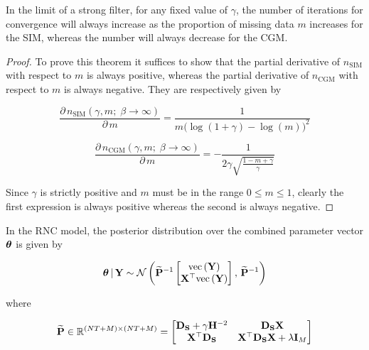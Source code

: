 \begin{theorem}
    \label{the:m_deriv}
    In the limit of a strong filter, for any fixed value of $\gamma$, the number of iterations for convergence will always increase as the proportion of missing data $m$ increases for the SIM, whereas the number will always decrease for the CGM.  
\end{theorem}

\begin{proof}
    To prove this theorem it suffices to show that the partial derivative of $n_\text{SIM}$ with respect to $m$ is always positive, whereas the partial derivative of $n_\text{CGM}$ with respect to $m$ is always negative. They are respectively given by 

    \begin{equation*}
        \frac{\partial \,  n_{\text{SIM}}(\gamma, m ; \; \beta \rightarrow \infty)}{\partial \, m}  =  \frac{1}{m\big(\log(1 + \gamma) - \log(m) \big)^2}
    \end{equation*}
    
    \begin{equation*}
        \frac{\partial \,  n_{\text{CGM}}(\gamma, m ; \; \beta \rightarrow \infty)}{\partial \, m}  = - \frac{1}{2 \gamma \sqrt{\frac{1 - m + \gamma}{\gamma}}}
    \end{equation*}

    Since $\gamma$ is strictly positive and $m$ must be in the range $0 \leq m \leq 1$, clearly the first expression is always positive whereas the second is always negative. 
    
\end{proof}

\begin{theorem}
    \label{the:RNC_post}
    In the RNC model, the posterior distribution over the combined parameter vector $\boldsymbol{\theta}$ is given by 

    \begin{equation}
        \boldsymbol{\theta} \, | \, \mathbf{Y} \sim \mathcal{N}\left(\widetilde{\mathbf{P}}^{-1} \begin{bmatrix} \text{\textup{vec}}\left(\mathbf{Y}\right) \\ \mathbf{X}^\top \text{\textup{vec}}\left(\mathbf{Y}\right) \end{bmatrix}, \, \widetilde{\mathbf{P}}^{-1}\right)
    \end{equation}

    where 

    \begin{equation}
        \widetilde{\mathbf{P}} \in \mathbb{R}^{(NT + M) \times (NT + M)}= 
        \begin{bmatrix}
         \mathbf{D}_{\mathbf{S}} + \gamma \mathbf{H}^{-2} & \mathbf{D}_{\mathbf{S}}  \mathbf{X} \\
         \mathbf{X}^\top \mathbf{D}_{\mathbf{S}} & \mathbf{X}^\top \mathbf{D}_{\mathbf{S}} \mathbf{X} + \lambda \mathbf{I}_M   
        \end{bmatrix}
    \end{equation}

\end{theorem}

